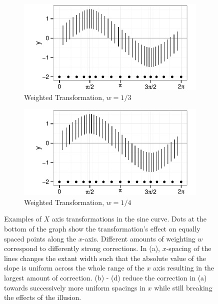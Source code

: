 \documentclass[11pt]{isuthesis}\usepackage[]{graphicx}\usepackage[]{color}
\begin{document}
\begin{figure}[h!tbp]
\begin{subfigure}[b]{.45\textwidth}\centering 
\includegraphics[keepaspectratio=TRUE,width=\textwidth]{fig-xtransform3}
\caption[Weighted transformation]{Weighted Transformation, $w=1/3$}
\label{fig:xtrans3}
\end{subfigure} \hfill
\begin{subfigure}[b]{.45\textwidth}\centering
\includegraphics[keepaspectratio=TRUE,width=\textwidth]{fig-xtransform4}
\caption[Weighted transformation]{Weighted Transformation, $w=1/4$}
\label{fig:xtrans4}
\end{subfigure}
\caption[X axis transformations]{Examples of $X$ axis transformations in the sine curve.  Dots at the bottom of the graph show the transformation's effect on equally spaced points along the $x$-axis. Different amounts of weighting $w$ correspond to differently strong corrections. In (a),   $x$-spacing of the lines changes the extant width such that the absolute value of the slope is uniform across the whole range of the $x$ axis resulting in the largest amount of correction.  (b) - (d) reduce the correction in (a) towards successively more uniform spacings in $x$ while still breaking the effects of the illusion.}
\label{fig:xtrans}
\end{figure}
\end{document}
